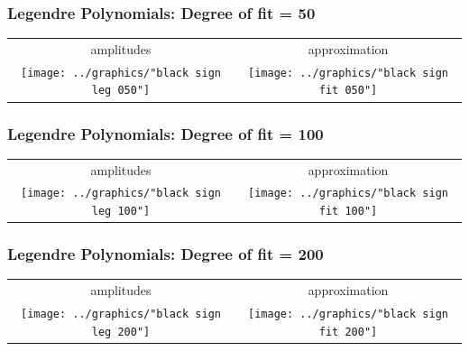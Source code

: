 \documentclass[handout]{beamer}
\begin{document}
{{{{\begin{frame}      %
  \frametitle{Legendre Polynomials: Degree of fit = 50}
  \begin{table}[htdp]
     \begin{center}
        \begin{tabular}{cc}
          amplitudes & approximation \\[10pt]
          \texttt{[image: ../graphics/"black sign leg 050"]} &
          \texttt{[image: ../graphics/"black sign fit 050"]}
        \end{tabular}
     \end{center}
  \end{table}%
\end{frame}

\begin{frame}      %
  \frametitle{Legendre Polynomials: Degree of fit = 100}
  \begin{table}[htdp]
     \begin{center}
        \begin{tabular}{cc}
          amplitudes & approximation \\[10pt]
          \texttt{[image: ../graphics/"black sign leg 100"]} &
          \texttt{[image: ../graphics/"black sign fit 100"]}
        \end{tabular}
     \end{center}
  \end{table}%
\end{frame}

\begin{frame}      %
  \frametitle{Legendre Polynomials: Degree of fit = 200}
  \begin{table}[htdp]
     \begin{center}
        \begin{tabular}{cc}
          amplitudes & approximation \\[10pt]
          \texttt{[image: ../graphics/"black sign leg 200"]} &
          \texttt{[image: ../graphics/"black sign fit 200"]}
        \end{tabular}
     \end{center}
  \end{table}%
  \donedot
\end{frame}

}}}}
\end{document}
